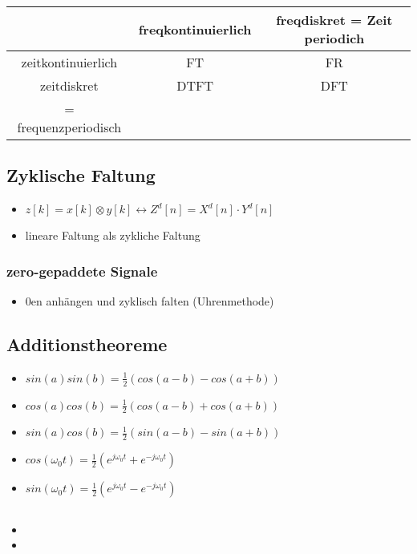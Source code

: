 \documentclass{article}
\begin{document}
 \begin{tabular}{c |c| c}
  & freqkontinuierlich & freqdiskret = Zeit periodich\\ \hline
  zeitkontinuierlich & FT & FR \\ \hline
 zeitdiskret &DTFT & DFT \\
 = frequenzperiodisch  & \\
 \end{tabular}

\subsection{Zyklische Faltung}
\begin{itemize}
\item $z[k] = x[k]\otimes y[k] \leftrightarrow Z^d[n] = X^d[n]\cdot Y^d[n]$
\item lineare Faltung als zykliche Faltung
\end{itemize}

\subsubsection{zero-gepaddete Signale}
\begin{itemize}
\item 0en anhängen und zyklisch falten (Uhrenmethode)

\end{itemize}

\subsection{Additionstheoreme}
\begin{itemize}
\item $sin(a)sin(b)=\frac{1}{2} (cos(a-b)-cos(a+b))$
\item $cos(a)cos(b)=\frac{1}{2} (cos(a-b)+cos(a+b))$
\item $sin(a)cos(b)=\frac{1}{2} (sin(a-b)-sin(a+b))$
\item $cos(\omega_0 t) = \frac{1}{2}(e^{j\omega_0 t}+e^{-j\omega_0 t })$
\item $sin(\omega_0 t) = \frac{1}{2}(e^{j\omega_0 t}-e^{-j\omega_0 t })$
\end{itemize}


\subsection{}
\begin{itemize}
\item
\item
\end{itemize}
\end{document}
